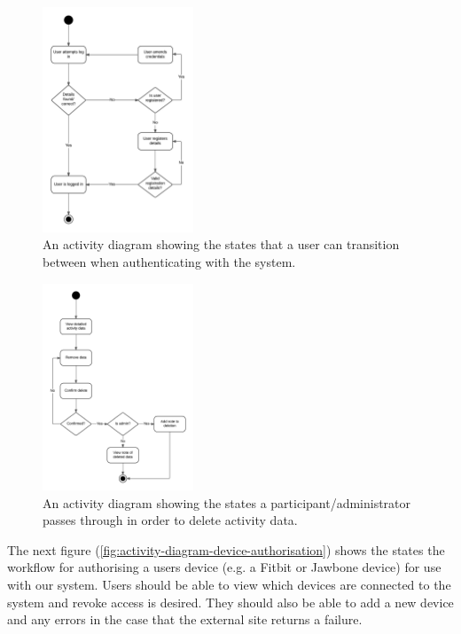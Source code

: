 \begin{figure}[H]
\centering
\includegraphics[width=0.4\textwidth]{../design/UML/StateActivity/User-Login-Registration.png}
\caption{An activity diagram showing the states that a user can transition between when authenticating with the system.}
\label{fig:activity-diagram-user-login}
\end{figure}

\begin{figure}[H]
\centering
\includegraphics[width=0.4\textwidth]{../design/UML/StateActivity/Accessing-Removing-Activity-Data.png}
\caption{An activity diagram showing the states a participant/administrator passes through in order to delete activity data.}
\label{fig:activity-diagram-accessing-removing-activity-data}
\end{figure}

The next figure (\ref{fig:activity-diagram-device-authorisation}) shows the states the workflow for authorising a users device (e.g. a Fitbit or Jawbone device) for use with our system. Users should be able to view which devices are connected to the system and revoke access is desired. They should also be able to add a new device and any errors in the case that the external site returns a failure.

